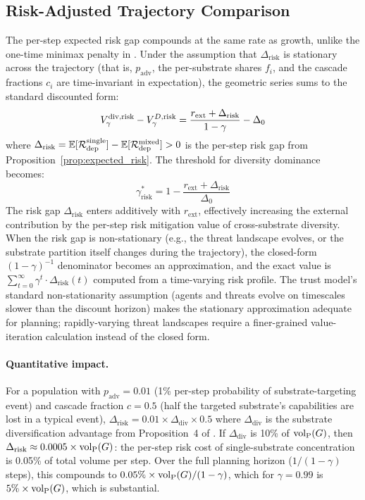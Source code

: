 \subsection{Risk-Adjusted Trajectory Comparison}
\label{sec:risk_adjusted}

The per-step expected risk gap compounds at the same rate as growth, unlike
the one-time minimax penalty in \citet{lasser2026horizon}. Under the
assumption that $\Delta_{\mathrm{risk}}$ is stationary across the
trajectory (that is, $p_{\mathrm{adv}}$, the per-substrate shares
$f_i$, and the cascade fractions $c_i$ are time-invariant in
expectation), the geometric series sums to the standard discounted
form:
\begin{equation}
\label{eq:risk_adjusted_per_step}
V_\gamma^{\mathrm{div},\mathrm{risk}} - V_\gamma^{D,\mathrm{risk}}
    = \frac{r_{\mathrm{ext}} + \Delta_{\mathrm{risk}}}{1 - \gamma} - \Delta_0
\end{equation}
where $\Delta_{\mathrm{risk}} =
\mathbb{E}[\mathcal{R}_{\mathrm{dep}}^{\mathrm{single}}] -
\mathbb{E}[\mathcal{R}_{\mathrm{dep}}^{\mathrm{mixed}}] > 0$ is the per-step
risk gap from Proposition~\ref{prop:expected_risk}. The threshold for
diversity dominance becomes:
\begin{equation}
\label{eq:risk_adjusted_threshold}
\gamma^*_{\mathrm{risk}} = 1 - \frac{r_{\mathrm{ext}} +
    \Delta_{\mathrm{risk}}}{\Delta_0}
\end{equation}
The risk gap $\Delta_{\mathrm{risk}}$ enters additively with
$r_{\mathrm{ext}}$, effectively increasing the external contribution by the
per-step risk mitigation value of cross-substrate diversity. When
the risk gap is non-stationary (e.g., the threat landscape
evolves, or the substrate partition itself changes during the
trajectory), the closed-form $(1 - \gamma)^{-1}$ denominator
becomes an approximation, and the exact value is
$\sum_{t=0}^{\infty} \gamma^t \cdot \Delta_{\mathrm{risk}}(t)$
computed from a time-varying risk profile. The trust model's
standard non-stationarity assumption (agents and threats evolve on
timescales slower than the discount horizon) makes the stationary
approximation adequate for planning; rapidly-varying threat
landscapes require a finer-grained value-iteration calculation
instead of the closed form.

\paragraph{Quantitative impact.} For a population with $p_{\mathrm{adv}} =
0.01$ (1\% per-step probability of substrate-targeting event) and cascade
fraction $c = 0.5$ (half the targeted substrate's capabilities are lost in
a typical event), $\Delta_{\mathrm{risk}} = 0.01 \times \Delta_{\mathrm{div}}
\times 0.5$ where $\Delta_{\mathrm{div}}$ is the substrate diversification
advantage from Proposition~4 of \citet{lasser2026horizon}. If
$\Delta_{\mathrm{div}}$ is 10\% of ${\operatorname{vol}_{\mathrm{P}}}(G)$, then $\Delta_{\mathrm{risk}}
\approx 0.0005 \times {\operatorname{vol}_{\mathrm{P}}}(G)$: the per-step risk cost of single-substrate
concentration is 0.05\% of total volume per step. Over the full planning
horizon ($1/(1-\gamma)$ steps), this compounds to $0.05\% \times
{\operatorname{vol}_{\mathrm{P}}}(G) / (1-\gamma)$, which for $\gamma = 0.99$ is $5\% \times
{\operatorname{vol}_{\mathrm{P}}}(G)$, which is substantial.

